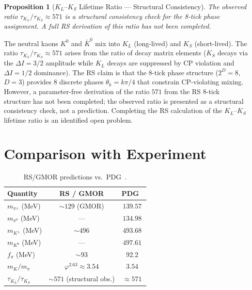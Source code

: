 \documentclass[12pt,a4paper]{article}
\newtheorem{proposition}[theorem]{Proposition}
\theoremstyle{definition}
\theoremstyle{remark}
\begin{document}
\begin{proposition}[$K_L$--$K_S$ Lifetime Ratio --- Structural Consistency]
\label{prop:kl-ks}
The observed ratio $\tau_{K_L}/\tau_{K_S} \approx 571$ is a structural
consistency check for the 8-tick phase assignment.  A full RS derivation
of this ratio has not been completed.
\end{proposition}

The neutral kaons $K^0$ and $\bar{K}^0$ mix into $K_L$ (long-lived)
and $K_S$ (short-lived).  The ratio $\tau_{K_L}/\tau_{K_S} \approx 571$
arises from the ratio of decay matrix elements ($K_S$ decays via the
$\Delta I = 3/2$ amplitude while $K_L$ decays are suppressed by CP
violation and $\Delta I = 1/2$ dominance).  The RS claim is that the
8-tick phase structure ($2^D = 8$, $D = 3$) provides 8 discrete phases
$\theta_k = k\pi/4$ that constrain CP-violating mixing.  However, a
parameter-free derivation of the ratio $571$ from the RS 8-tick
structure has not been completed; the observed ratio is presented as a
structural consistency check, not a prediction.  Completing the RS
calculation of the $K_L$--$K_S$ lifetime ratio is an identified open problem.

\section{Comparison with Experiment}
\label{sec:comparison}

\begin{table}[htbp]
\centering
\begin{tabular}{lcc}
\toprule
Quantity & RS / GMOR & PDG~\cite{PDG} \\
\midrule
$m_{\pi^\pm}$ (MeV) & $\sim 129$ (GMOR) & $139.57$ \\
$m_{\pi^0}$ (MeV) & --- & $134.98$ \\
$m_{K^\pm}$ (MeV) & $\sim 496$ & $493.68$ \\
$m_{K^0}$ (MeV) & --- & $497.61$ \\
$f_\pi$ (MeV) & $\sim 93$ & $92.2$ \\
$m_K/m_\pi$ & $\varphi^{2.63} \approx 3.54$ & $3.54$ \\
$\tau_{K_L}/\tau_{K_S}$ & $\sim 571$ (structural obs.) & $\approx 571$ \\
\bottomrule
\end{tabular}
\caption{RS/GMOR predictions vs.\ PDG~\cite{PDG}.}
\label{tab:comparison}
\end{table}
\end{document}
